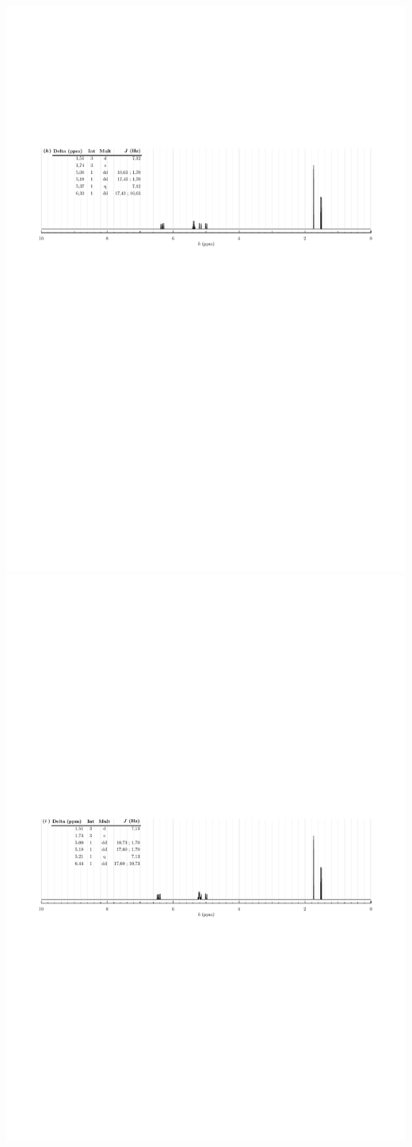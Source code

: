\begin{center}
    \includegraphics[width=.95\linewidth]{chimiePC/orga/RMN_3E-3.pdf}
    \includegraphics[width=.95\linewidth]{chimiePC/orga/RMN_3Z-3.pdf}

\end{center}
